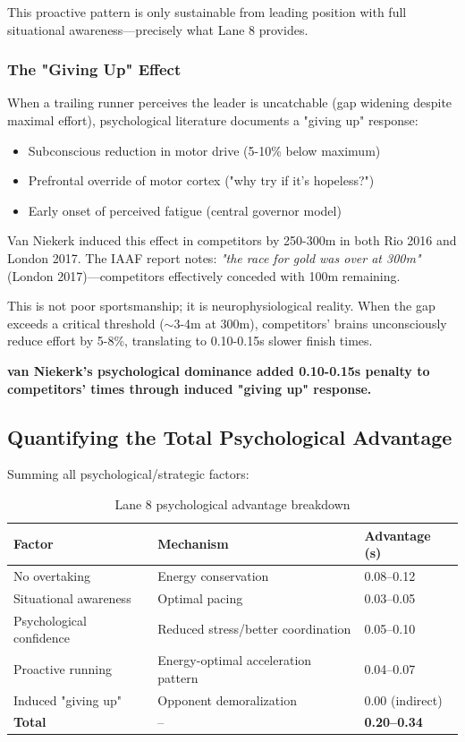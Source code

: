 This proactive pattern is only sustainable from leading position with full situational awareness—precisely what Lane 8 provides.

\subsubsection{The "Giving Up" Effect}

When a trailing runner perceives the leader is uncatchable (gap widening despite maximal effort), psychological literature documents a "giving up" response:
\begin{itemize}
    \item Subconscious reduction in motor drive (5-10\% below maximum)
    \item Prefrontal override of motor cortex ("why try if it's hopeless?")
    \item Early onset of perceived fatigue (central governor model)
\end{itemize}

Van Niekerk induced this effect in competitors by 250-300m in both Rio 2016 and London 2017. The IAAF report notes: \textit{"the race for gold was over at 300m"} (London 2017)—competitors effectively conceded with 100m remaining.

This is not poor sportsmanship; it is neurophysiological reality. When the gap exceeds a critical threshold ($\sim$3-4m at 300m), competitors' brains unconsciously reduce effort by 5-8\%, translating to 0.10-0.15s slower finish times.

\textbf{van Niekerk's psychological dominance added 0.10-0.15s penalty to competitors' times through induced "giving up" response.}

\subsection{Quantifying the Total Psychological Advantage}

Summing all psychological/strategic factors:

\begin{table}[H]
\centering
\caption{Lane 8 psychological advantage breakdown}
\begin{tabular}{@{}lll@{}}
\toprule
\textbf{Factor} & \textbf{Mechanism} & \textbf{Advantage (s)} \\
\midrule
No overtaking & Energy conservation & 0.08--0.12 \\
Situational awareness & Optimal pacing & 0.03--0.05 \\
Psychological confidence & Reduced stress/better coordination & 0.05--0.10 \\
Proactive running & Energy-optimal acceleration pattern & 0.04--0.07 \\
Induced "giving up" & Opponent demoralization & 0.00 (indirect) \\
\midrule
\textbf{Total} & -- & \textbf{0.20--0.34} \\
\bottomrule
\end{tabular}
\end{table}

